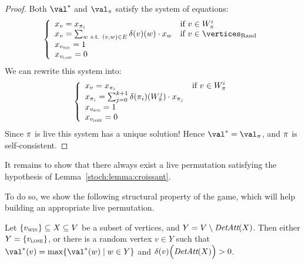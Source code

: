 \begin{proof}
  Both $\val^*$ and $\val_\perm$ satisfy the system of equations:
  \[
  \left\{\begin{array}{ll} 
      x_v = x_{\perm_i} & \text{if}\ v \in W_\perm^i \\ 
      x_v = \sum_{w\ \text{s.t.}\ (v,w) \in E} \delta(v)(w) \cdot x_w
      & \text{if}\ v \in \Randomvertices \\
      x_{\vwin} = 1 \\
      x_{\vlose} = 0
    \end{array}\right.
  \]
  We can rewrite this system into:
  \[
  \left\{\begin{array}{ll} 
      x_v = x_{\pi_i} & \text{if}\ v \in W_\pi^i \\ 
      x_{\pi_i} = \sum_{j=0}^{k+1} \delta(\pi_i)(W_\pi^j) \cdot x_{\pi_j}
      & \\
      x_{v_{\textsc{win}}} = 1 \\
      x_{v_{\textsc{lose}}} = 0
    \end{array}\right.
  \]
  Since $\pi$ is live this system has a unique solution!  Hence
  $\val^* = \val_\perm$, and $\pi$ is self-consistent.
\end{proof}

It remains to show that there always exist  a live permutation
satisfying the hypothesis of Lemma~\ref{stoch:lemma:croissant}.

To do so, we show the following structural property of the game, which
will help building an appropriate live permutation.

\begin{lemma}
  \label{stoch:lemma:structure}
  Let $\{v_{\textsc{win}}\} \subseteq X \subseteq V$ be a subset of vertices, and
  $Y = V \setminus \textit{DetAtt}(X)$. Then either $Y = \{v_{\textsc{lose}}\}$, or there
  is a random vertex $v \in Y$ such that $\val^*(v) = \max\{\val^*(w)
  \mid w \in Y\}$ and $\delta(v)\Big(\textit{DetAtt}(X)\Big)>0$.
\end{lemma}

